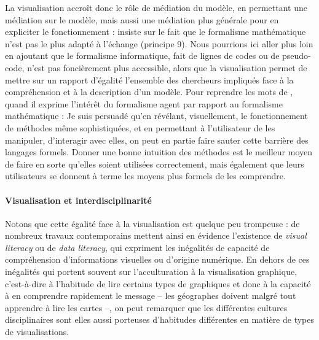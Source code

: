 \documentclass[a4paper, 12pt]{article}
\begin{document}
La visualisation accroît donc le rôle de médiation du modèle, en permettant une médiation sur le modèle, mais aussi une médiation plus générale pour en expliciter le fonctionnement :  insiste sur le fait que le formalisme mathématique n'est pas le plus adapté à l'échange (principe 9).
Nous pourrions ici aller plus loin en ajoutant que le formalisme informatique, fait de lignes de codes ou de pseudo-code, n'est pas foncièrement plus accessible, alors que la visualisation permet de mettre sur un rapport d'égalité l'ensemble des chercheurs impliqués face à la compréhension et à la description d'un modèle.
Pour reprendre les mots de \textcite[\ppno~83]{banos_pour_2013}, quand il exprime l'intérêt du formalisme agent par rapport au formalisme mathématique : \og Je suis persuadé qu'en révélant, visuellement, le fonctionnement de méthodes même sophistiquées, et en permettant à l'utilisateur de les manipuler, d'interagir avec elles, on peut en partie faire sauter cette barrière des langages formels.
Donner une bonne intuition des méthodes est le meilleur moyen de faire en sorte qu'elles soient utilisées correctement, mais également que leurs utilisateurs se donnent à terme les moyens plus formels de les comprendre.\fg{}



\paragraph{Visualisation et interdisciplinarité}

Notons que cette égalité face à la visualisation est quelque peu trompeuse : de nombreux travaux contemporains mettent ainsi en évidence l'existence de \og\textit{visual literacy}\fg{} ou de \og\textit{data literacy}\fg{}, qui expriment les inégalités de capacité de compréhension d'informations visuelles ou d'origine numérique.
En dehors de ces inégalités qui portent souvent sur l'acculturation à la visualisation graphique, c'est-à-dire à l'habitude de lire certains types de graphiques et donc à la capacité à en comprendre rapidement le message -- les géographes doivent malgré tout \og apprendre à lire\fg{} les cartes --, on peut remarquer que les différentes cultures disciplinaires sont elles aussi porteuses d'habitudes différentes en matière de types de visualisations.
\end{document}

